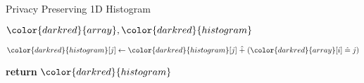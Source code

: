 \begin{algorithm}[H]
\caption{Privacy Preserving 1D Histogram}\label{a:1d-simple-histogram-categorical}
\begin{algorithmic}[1]
\renewcommand{\algorithmicrequire}{\textbf{Private Vars:}}
\Require ${\color{darkred}{array}}, {\color{darkred}{histogram}}$




            \State ${\color{darkred}{histogram}}[j] \gets {\color{darkred}{histogram}}[j] \hplus ({\color{darkred}{array}}[i] \heq j)$

        \EndFor{}
    \EndFor
    \State \textbf{return} {${\color{darkred}{histogram}}$}
\EndProcedure
\end{algorithmic}
\end{algorithm}
